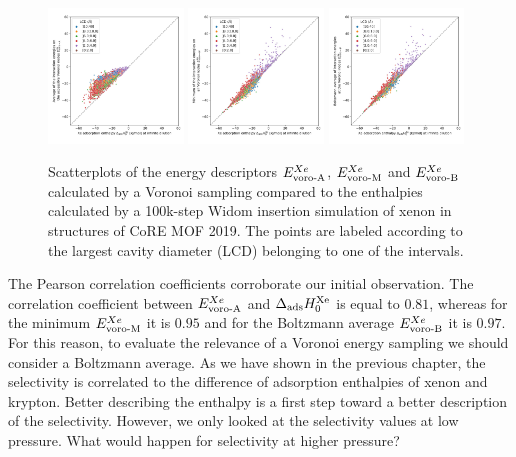 \documentclass[main]{subfiles}
\begin{document}
\begin{figure}[ht]
  \centering
    \includegraphics[width=0.32\textwidth]{figures/3-fastsim/H_Xe_0_vs_E_voro_A_overview.jpg}
    \includegraphics[width=0.32\textwidth]{figures/3-fastsim/H_Xe_0_vs_E_voro_M_overview.jpg}
    \includegraphics[width=0.32\textwidth]{figures/3-fastsim/H_Xe_0_vs_E_voro_B_overview.jpg}
    \caption{Scatterplots of the energy descriptors $E_{\text{voro-A}}^{Xe}$, $E_{\text{voro-M}}^{Xe}$ and $E_{\text{voro-B}}^{Xe}$ calculated by a Voronoi sampling compared to the enthalpies calculated by a 100k-step Widom insertion simulation of xenon in structures of CoRE MOF 2019. The points are labeled according to the largest cavity diameter (LCD) belonging to one of the intervals.}\label{fgr:compa_voro_0}
\end{figure}

The Pearson correlation coefficients corroborate our initial observation. The correlation coefficient between $E_{\text{voro-A}}^{Xe}$ and $\Delta_{\text{ads}} H_{0}^{\text{Xe}}$ is equal to $0.81$, whereas for the minimum $E_{\text{voro-M}}^{Xe}$ it is $0.95$ and for the Boltzmann average $E_{\text{voro-B}}^{Xe}$ it is $0.97$. For this reason, to evaluate the relevance of a Voronoi energy sampling we should consider a Boltzmann average. As we have shown in the previous chapter, the selectivity is correlated to the difference of adsorption enthalpies of xenon and krypton. Better describing the enthalpy is a first step toward a better description of the selectivity. However, we only looked at the selectivity values at low pressure. What would happen for selectivity at higher pressure?
\end{document}
